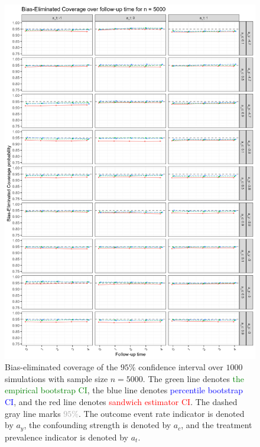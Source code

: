 \documentclass[pdflatex,sn-vancouver-ay]{sn-jnl}%
\theoremstyle{thmstyleone}%
\theoremstyle{thmstyletwo}%
\theoremstyle{thmstylethree}%
\begin{document}
\begin{appendices}
\begin{figure}[H]
\centering
\includegraphics[height=0.95\textheight]{plots/plots_bias_coverage5000.png}
\caption{Bias-eliminated coverage of the $95\%$ confidence interval over $1000$ simulations with sample size $n = 5000$. The green line denotes \textcolor{green}{the empirical bootstrap CI}, the blue line denotes \textcolor{blue}{percentile bootstrap CI}, and the red line denotes \textcolor{red}{sandwich estimator CI}. The dashed gray line marks \textcolor{darkgray}{$95\%$}. The outcome event rate indicator is denoted by $a_y$, the confounding strength is denoted by $a_c$, and the treatment prevalence indicator is denoted by $a_t$.}\label{plt:biascoverage5000}
\end{figure}

\newpage


\end{appendices}
\end{document}
